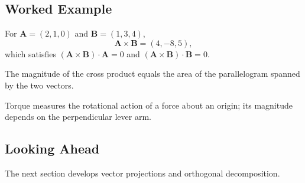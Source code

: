\subsection{Worked Example}
For $\mathbf A=(2,1,0)$ and $\mathbf B=(1,3,4)$,
\[
\mathbf A\times\mathbf B=(4,-8,5),
\]
which satisfies $(\mathbf A\times\mathbf B)\cdot\mathbf A=0$ and
$(\mathbf A\times\mathbf B)\cdot\mathbf B=0$.

\begin{bookfigure}{The magnitude of the cross product equals the area of the parallelogram spanned by the two vectors.}

\label{fig:parallelogram-area}
\end{bookfigure}

\begin{bookfigure}{Torque measures the rotational action of a force about an origin; its magnitude depends on the perpendicular lever arm.}

\label{fig:torque-lever-arm}
\end{bookfigure}

\subsection{Looking Ahead}
The next section develops vector projections and orthogonal decomposition.
